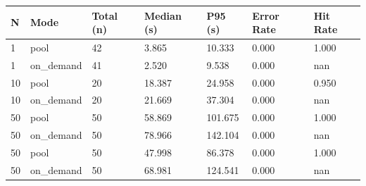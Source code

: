 \begin{tabular}{lllllll}
\toprule
N & Mode & Total (n) & Median (s) & P95 (s) & Error Rate & Hit Rate \\
\midrule
1 & pool & 42 & 3.865 & 10.333 & 0.000 & 1.000 \\
1 & on_demand & 41 & 2.520 & 9.538 & 0.000 & nan \\
10 & pool & 20 & 18.387 & 24.958 & 0.000 & 0.950 \\
10 & on_demand & 20 & 21.669 & 37.304 & 0.000 & nan \\
50 & pool & 50 & 58.869 & 101.675 & 0.000 & 1.000 \\
50 & on_demand & 50 & 78.966 & 142.104 & 0.000 & nan \\
50 & pool & 50 & 47.998 & 86.378 & 0.000 & 1.000 \\
50 & on_demand & 50 & 68.981 & 124.541 & 0.000 & nan \\
\bottomrule
\end{tabular}
